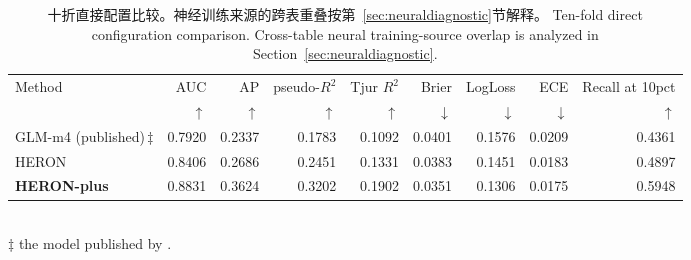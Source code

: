 \begin{table}[htbp]\centering\footnotesize
\caption{\ifzh
十折直接配置比较。神经训练来源的跨表重叠按第~\ref{sec:neuraldiagnostic}节解释。
\else
Ten-fold direct configuration comparison. Cross-table neural training-source overlap is analyzed in Section~\ref{sec:neuraldiagnostic}.
\fi}\label{tab:bench_headtohead}
\begin{adjustbox}{max width=\linewidth}
\begin{tabular}{lrrrrrrrr}\toprule
Method & AUC & AP & pseudo-$R^2$ & Tjur $R^2$ & Brier & LogLoss & ECE & Recall at 10pct \\
& $\uparrow$ & $\uparrow$ & $\uparrow$ & $\uparrow$ & $\downarrow$ & $\downarrow$ & $\downarrow$ & $\uparrow$ \\ \midrule
GLM-m4 (published)\,$\ddagger$ & 0.7920 & 0.2337 & 0.1783 & 0.1092 & 0.0401 & 0.1576 & 0.0209 & 0.4361 \\
HERON & 0.8406 & 0.2686 & 0.2451 & 0.1331 & 0.0383 & 0.1451 & 0.0183 & 0.4897 \\
\textbf{HERON-plus} & 0.8831 & 0.3624 & 0.3202 & 0.1902 & 0.0351 & 0.1306 & 0.0175 & 0.5948 \\
\bottomrule\end{tabular}
\end{adjustbox}
\\[2pt]\footnotesize $\ddagger$ the model published by \cite{ortiz2026}.
\end{table}